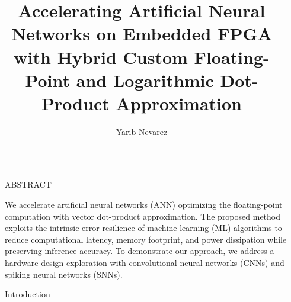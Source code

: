 \documentclass[final]{beamer}
\title{Accelerating Artificial Neural Networks on Embedded FPGA with Hybrid Custom Floating-Point and Logarithmic Dot-Product Approximation} %
\author{Yarib Nevarez} %
\institute{Ph.D. candidate at Universit\"at Bremen} %
\newlength{\sepwid}
\newlength{\onecolwid}
\begin{document}

\setlength{\belowcaptionskip}{2ex} %
\setlength\belowdisplayshortskip{2ex} %

\begin{frame}[t] %

\begin{columns}[t] %

\begin{column}{\sepwid}\end{column} %

\begin{column}{\onecolwid} %


\begin{alertblock}{ABSTRACT}

We accelerate artificial neural networks (ANN) optimizing the floating-point computation with vector dot-product approximation. The proposed method exploits the intrinsic error resilience of machine learning (ML) algorithms to reduce computational latency, memory footprint, and power dissipation while preserving inference accuracy. To demonstrate our approach, we address a hardware design exploration with convolutional neural networks (CNNs) and spiking neural networks (SNNs).
\end{alertblock}


\begin{block}{Introduction}


\end{block}
\end{column}
\end{columns}
\end{frame}
\end{document}

